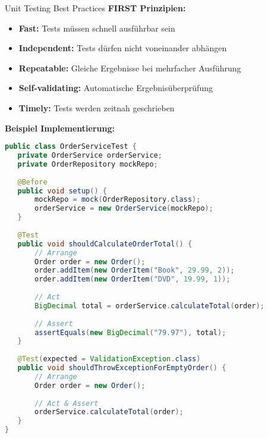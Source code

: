 \begin{example2}{Unit Testing Best Practices}
\textbf{FIRST Prinzipien:}
\begin{itemize}
   \item \textbf{Fast:} Tests müssen schnell ausführbar sein
   \item \textbf{Independent:} Tests dürfen nicht voneinander abhängen
   \item \textbf{Repeatable:} Gleiche Ergebnisse bei mehrfacher Ausführung
   \item \textbf{Self-validating:} Automatische Ergebnisüberprüfung
   \item \textbf{Timely:} Tests werden zeitnah geschrieben
\end{itemize}

\textbf{Beispiel Implementierung:}
\begin{lstlisting}[language=Java, style=basesmol]
public class OrderServiceTest {
   private OrderService orderService;
   private OrderRepository mockRepo;
   
   @Before
   public void setup() {
       mockRepo = mock(OrderRepository.class);
       orderService = new OrderService(mockRepo);
   }
   
   @Test
   public void shouldCalculateOrderTotal() {
       // Arrange
       Order order = new Order();
       order.addItem(new OrderItem("Book", 29.99, 2));
       order.addItem(new OrderItem("DVD", 19.99, 1));
       
       // Act
       BigDecimal total = orderService.calculateTotal(order);
       
       // Assert
       assertEquals(new BigDecimal("79.97"), total);
   }
   
   @Test(expected = ValidationException.class)
   public void shouldThrowExceptionForEmptyOrder() {
       // Arrange
       Order order = new Order();
       
       // Act & Assert
       orderService.calculateTotal(order);
   }
}
\end{lstlisting}
\end{example2}

